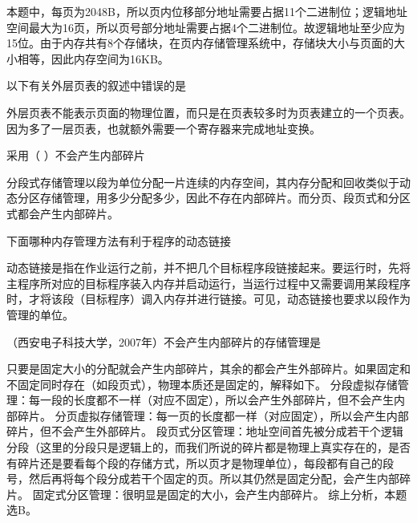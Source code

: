 \par{}
\begin{solution}本题中，每页为2048B，所以页内位移部分地址需要占据11个二进制位；逻辑地址空间最大为16页，所以页号部分地址需要占据4个二进制位。故逻辑地址至少应为15位。由于内存共有8个存储块，在页内存储管理系统中，存储块大小与页面的大小相等，因此内存空间为16KB。
\end{solution}
\question 以下有关外层页表的叙述中错误的是
\par{}
\begin{solution}外层页表不能表示页面的物理位置，而只是在页表较多时为页表建立的一个页表。因为多了一层页表，也就额外需要一个寄存器来完成地址变换。
\end{solution}
\question 采用（ ）不会产生内部碎片
\par{}
\begin{solution}分段式存储管理以段为单位分配一片连续的内存空间，其内存分配和回收类似于动态分区存储管理，用多少分配多少，因此不存在内部碎片。而分页、段页式和分区式都会产生内部碎片。
\end{solution}
\question 下面哪种内存管理方法有利于程序的动态链接
\par{}
\begin{solution}动态链接是指在作业运行之前，并不把几个目标程序段链接起来。要运行时，先将主程序所对应的目标程序装入内存并启动运行，当运行过程中又需要调用某段程序时，才将该段（目标程序）调入内存并进行链接。可见，动态链接也要求以段作为管理的单位。
\end{solution}
\question （西安电子科技大学，2007年）不会产生内部碎片的存储管理是
\par{}
\begin{solution}只要是固定大小的分配就会产生内部碎片，其余的都会产生外部碎片。如果固定和不固定同时存在（如段页式），物理本质还是固定的，解释如下。
分段虚拟存储管理：每一段的长度都不一样（对应不固定），所以会产生外部碎片，但不会产生内部碎片。
分页虚拟存储管理：每一页的长度都一样（对应固定），所以会产生内部碎片，但不会产生外部碎片。
段页式分区管理：地址空间首先被分成若干个逻辑分段（这里的分段只是逻辑上的，而我们所说的碎片都是物理上真实存在的，是否有碎片还是要看每个段的存储方式，所以页才是物理单位），每段都有自己的段号，然后再将每个段分成若干个固定的页。所以其仍然是固定分配，会产生内部碎片。
固定式分区管理：很明显是固定的大小，会产生内部碎片。 综上分析，本题选B。
\end{solution}
